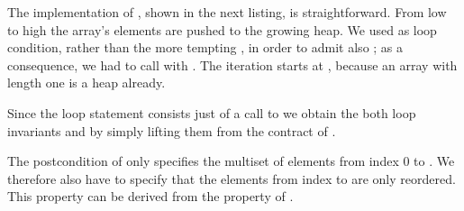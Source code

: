 The implementation of \makeheap, shown in the next listing, is straightforward.
%
From low to high the array's elements are pushed to the growing heap.
%
We used  as loop condition, rather than the more tempting
, in order to admit also ;
as a consequence, we had to call  with .
%
The iteration starts at , because an array with length one is
a heap already.



Since the loop statement consists just of a call to 
we obtain the both loop invariants  and  by simply 
lifting them from the contract of \pushheap.

The postcondition of \pushheap only specifies the multiset
of elements from index 0 to .
%
We therefore also have to specify
that the elements from index  to   are only reordered.
%
This property can be derived from the  property of \pushheap.

\clearpage

